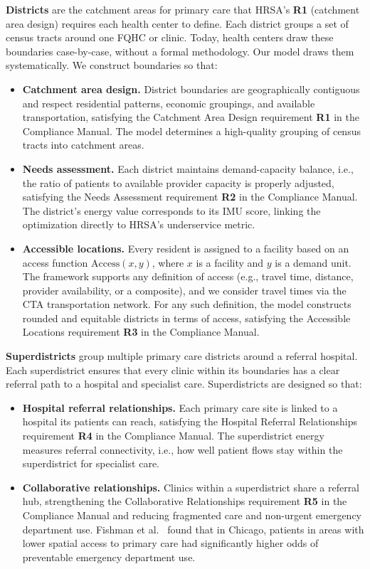 \documentclass[11pt]{article}
\begin{document}
\textbf{Districts} are the catchment areas for primary care that HRSA's \textbf{R1} (catchment area design) requires 
each health center to define. Each district groups a set of census tracts around one FQHC or clinic. Today, health centers draw these 
boundaries case-by-case, without a formal methodology. Our model draws them systematically. We construct boundaries so that:
\begin{itemize}[itemsep=1mm]
    \item \textbf{Catchment area design.} District boundaries are geographically contiguous and respect residential patterns, 
    economic groupings, and available transportation, satisfying the Catchment Area Design requirement \textbf{R1} in the 
    Compliance Manual. The model determines a high-quality grouping of census
    tracts into catchment areas.
    \item \textbf{Needs assessment.} Each district maintains demand-capacity balance, i.e., the ratio of patients to
    available provider capacity is properly adjusted, satisfying the Needs Assessment requirement \textbf{R2} in the Compliance
    Manual. The district's energy value corresponds to its IMU score, linking the optimization directly to HRSA's underservice metric.
    \item \textbf{Accessible locations.} Every resident is assigned to a facility based on an access function $\mathrm{Access}(x, y)$,
     where $x$ is a facility and $y$ is a demand unit. The framework supports any definition of access (e.g., travel time, distance, 
     provider availability, or a composite), and we consider travel times via the CTA transportation network. For any such definition, the 
     model constructs rounded and equitable districts in terms of access, satisfying the Accessible Locations requirement \textbf{R3} 
     in the Compliance Manual.
\end{itemize}

\textbf{Superdistricts} group multiple primary care districts around a referral hospital. Each superdistrict ensures that every 
clinic within its boundaries has a clear referral path to a hospital and specialist care. Superdistricts are designed so that:
\begin{itemize}[itemsep=1mm]
    \item \textbf{Hospital referral relationships.} Each primary care site is linked to a hospital its patients can reach, 
    satisfying the Hospital Referral Relationships requirement \textbf{R4} in the Compliance Manual. The superdistrict 
    energy measures referral connectivity, i.e., how well patient flows stay within the superdistrict for specialist care.
    \item \textbf{Collaborative relationships.} Clinics within a superdistrict share a referral hub, strengthening the
    Collaborative Relationships requirement \textbf{R5} in the Compliance Manual and reducing fragmented care and non-urgent
    emergency department use. Fishman et al.~\cite{fishman2018spatial} found that in Chicago, patients in areas with lower
    spatial access to primary care had significantly higher odds of preventable emergency department use.
\end{itemize}
\end{document}
